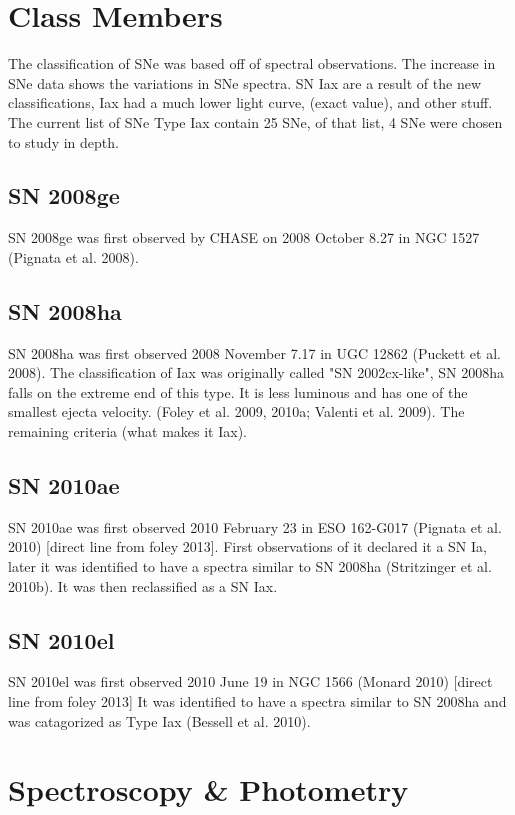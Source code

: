 \documentclass[preprint2]{aastex}
\begin{document}

\section{Class Members}
The classification of SNe was based off of spectral observations.
The increase in SNe data shows the variations in SNe spectra. 
SN Iax are a result of the new classifications, Iax had a much lower
 light curve, (exact value), and other stuff.  
The current list of SNe Type Iax contain 25 SNe,
of that list, 4 SNe were chosen to study in depth. 

\subsection{SN 2008ge}
SN 2008ge was first observed by CHASE on 2008
October 8.27 in NGC 1527 (Pignata et al. 2008).

\subsection{SN 2008ha}

SN 2008ha was first observed 2008 November 7.17 in UGC 12862 
(Puckett et al. 2008).
The classification of Iax was originally called "SN 2002cx-like",
SN 2008ha falls on the extreme end of this type. 
It is less luminous and has one of the smallest ejecta velocity. 
(Foley et al. 2009, 2010a; Valenti et al. 2009). 
The remaining criteria (what makes it Iax).

\subsection{SN 2010ae}
SN 2010ae was first observed 2010 February 23 in ESO 162-G017
(Pignata et al. 2010) [direct line from foley 2013].
First observations of it declared it a SN Ia, later it was identified to have
a spectra similar to SN 2008ha (Stritzinger et al. 2010b). 
It was then reclassified as a SN Iax.

\subsection{SN 2010el}
SN 2010el was first observed 2010 June 19 in NGC 1566
(Monard 2010) [direct line from foley 2013]
It was identified to have a spectra similar to SN 2008ha and was 
catagorized as Type Iax (Bessell et al. 2010).

\section{Spectroscopy \& Photometry}
\end{document}
